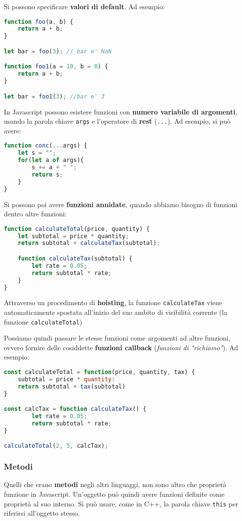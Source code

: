 \documentclass[a4paper,11pt]{article}
\begin{document}
Si possono specificare \textbf{valori di default}. Ad esempio:
\begin{lstlisting}[language=javascript, style=codestyle]	
function foo(a, b) {
	return a + b;
}

let bar = foo(3); // bar e' NaN

function foo1(a = 10, b = 0) {
	return a + b;
}

let bar = foo1(3); //bar e' 3
\end{lstlisting}

In Javascript possono esistere funzioni con \textbf{numero variabile di argomenti}, usando la parola chiave \lstinline|args| e l'operatore di \textbf{rest} (\lstinline|...|). Ad esempio, si può avere:
\begin{lstlisting}[language=javascript, style=codestyle]	
function conc(...args) {
	let s = "";
	for(let a of args){
		s += a + " ";
		return s;
	}
}
\end{lstlisting}

Si possono poi avere \textbf{funzioni annidate}, quando abbiamo bisogno di funzioni dentro altre funzioni:
\begin{lstlisting}[language=javascript, style=codestyle]	
function calculateTotal(price, quantity) {
	let subtotal = price * quantity;
	return subtotal + calculateTax(subtotal);

	function calculateTax(subtotal) {
		let rate = 0.05;
		return subtotal * rate;
	}
}
\end{lstlisting}

Attraverso un procedimento di \textbf{hoisting}, la funzione \lstinline|calculateTax| viene automaticamente spostata all'inizio del suo ambito di visibilità corrente (la funzione \lstinline|calculateTotal|)

Possiamo quindi passare le stesse funzioni come argomenti ad altre funzioni, ovvero fornire delle cosiddette \textbf{funzioni callback} (\textit{funzioni di "richiamo"}). Ad esempio:
\begin{lstlisting}[language=javascript, style=codestyle]	
const calculateTotal = function(price, quantity, tax) {
	subtotal = price * quantity:
	return subtotal + tax(subtotal)
}

const calcTax = function calculateTax() {
		let rate = 0.05;
		return subtotal * rate;
}

calculateTotal(2, 5, calcTax);
\end{lstlisting}

\subsubsection{Metodi}
Quelli che erano \textbf{metodi} negli altri linguaggi, non sono altro che proprietà funzione in Javascript.
Un'oggetto può quindi avere funzioni definite come proprietà al suo interno.
Si può usare, come in C++, la parola chiave \lstinline|this| per riferirsi all'oggetto stesso.
\end{document}
